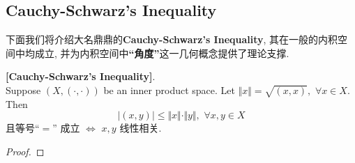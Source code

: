 \subsection{Cauchy-Schwarz's Inequality}
	下面我们将介绍大名鼎鼎的\textbf{Cauchy-Schwarz's Inequality}, 其在一般的内积空间中均成立, 并为内积空间中\textbf{“角度”}这一几何概念提供了理论支撑. 
	
	\vspace{1em}
	
	\begin{thm}\label{thm 3.1.1}
		\textbf{[Cauchy-Schwarz's Inequality]}. \\
		Suppose $(X , (\cdot , \cdot))$ be an inner product space. Let $\Vert x \Vert = \sqrt{(x , x)} , \,\, \forall x \in X$. Then 
		\[ \Big| (x , y) \Big| \leq \Vert x \Vert \cdot \Vert y \Vert , \,\, \forall x , y \in X \]
		且等号“$=$” 成立$\,\, \Leftrightarrow \,\, x , y$ 线性相关. 
		
		\vspace{4em}
		
		\begin{proof}
			
		\end{proof}
	\end{thm}
















	\ifx\allfiles\undefined

\fi